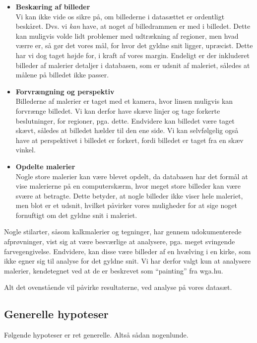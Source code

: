 {\begin{itemize}
    \item \textbf{Beskæring af billeder}\\
        Vi kan ikke vide os sikre på, om billederne i datasættet er
        ordentligt beskåret. Dvs. vi \emph{kan} have, at noget af
        billedrammen er med i billedet. Dette kan muligvis volde lidt
        problemer med udtrækning af regioner, men hvad værre er, så gør
        det vores mål, for hvor det gyldne snit ligger, upræcist. Dette
        har vi dog taget højde for, i kraft af vores margin.  Endeligt
        er der inkluderet billeder af malerier detaljer i databasen, som
        er udsnit af maleriet, således at målene på billedet ikke
        passer.
    \item \textbf{Forvrængning og perspektiv}\\
        Billederne af malerier er taget med et kamera, hvor linsen muligvis kan
        forvrænge billedet. Vi kan derfor have skæve linjer og tage
        forkerte beslutninger, for regioner, pga. dette. Endvidere kan
        billedet være taget skævt, således at billedet hælder til den
        ene side. Vi kan selvfølgelig også have at perspektivet i
        billedet er forkert, fordi billedet er taget fra en skæv vinkel.
    \item \textbf{Opdelte malerier}\\
        Nogle store malerier kan være blevet opdelt, da databasen har
        det formål at vise malerierne på en computerskærm, hvor meget
        store billeder kan være svære at betragte. Dette betyder, at
        nogle billeder ikke viser hele maleriet, men blot er et udsnit,
        hvilket påvirker vores muligheder for at sige noget fornuftigt
        om det gyldne snit i maleriet.
\end{itemize}

Nogle stilarter, såsom kalkmalerier og tegninger, har gennem
udokumenterede afprøvninger, vist sig at være besværlige at analysere,
pga. meget svingende farvegengivelse. Endvidere, kan disse være billeder
af en hvælving i en kirke, som ikke egner sig til analyse for det gyldne
snit. Vi har derfor valgt kun at analysere malerier, kendetegnet ved at
de er beskrevet som ``painting'' fra wga.hu.

Alt det ovenstående vil påvirke resultaterne, ved analyse på vores
datasæt.

\subsection{Generelle hypoteser}
Følgende hypoteser er ret generelle. Altså sådan nogenlunde.

}

